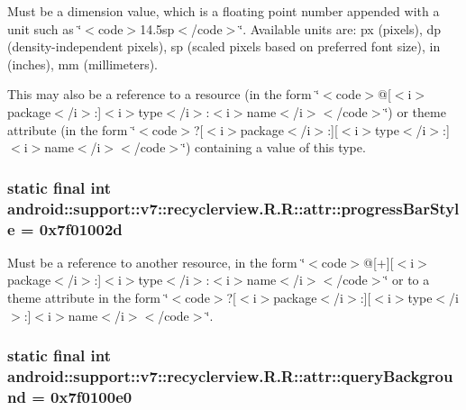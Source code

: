 Must be a dimension value, which is a floating point number appended with a unit such as \char`\"{}$<$code$>$14.5sp$<$/code$>$\char`\"{}. Available units are: px (pixels), dp (density-independent pixels), sp (scaled pixels based on preferred font size), in (inches), mm (millimeters). 

This may also be a reference to a resource (in the form \char`\"{}$<$code$>$@\mbox{[}$<$i$>$package$<$/i$>$:\mbox{]}$<$i$>$type$<$/i$>$:$<$i$>$name$<$/i$>$$<$/code$>$\char`\"{}) or theme attribute (in the form \char`\"{}$<$code$>$?\mbox{[}$<$i$>$package$<$/i$>$:\mbox{]}\mbox{[}$<$i$>$type$<$/i$>$:\mbox{]}$<$i$>$name$<$/i$>$$<$/code$>$\char`\"{}) containing a value of this type. \hypertarget{classandroid_1_1support_1_1v7_1_1recyclerview_1_1_r_1_1attr_d600f2f0a259e1c72ba1d4e9cbf3bd9f}{
\subsubsection[{progressBarStyle}]{\setlength{\rightskip}{0pt plus 5cm}static final int android::support::v7::recyclerview.R.R::attr::progressBarStyle = 0x7f01002d}}
\label{classandroid_1_1support_1_1v7_1_1recyclerview_1_1_r_1_1attr_d600f2f0a259e1c72ba1d4e9cbf3bd9f}


Must be a reference to another resource, in the form \char`\"{}$<$code$>$@\mbox{[}+\mbox{]}\mbox{[}$<$i$>$package$<$/i$>$:\mbox{]}$<$i$>$type$<$/i$>$:$<$i$>$name$<$/i$>$$<$/code$>$\char`\"{} or to a theme attribute in the form \char`\"{}$<$code$>$?\mbox{[}$<$i$>$package$<$/i$>$:\mbox{]}\mbox{[}$<$i$>$type$<$/i$>$:\mbox{]}$<$i$>$name$<$/i$>$$<$/code$>$\char`\"{}. \hypertarget{classandroid_1_1support_1_1v7_1_1recyclerview_1_1_r_1_1attr_2b81323e0855856982097b3c13b3d788}{
\subsubsection[{queryBackground}]{\setlength{\rightskip}{0pt plus 5cm}static final int android::support::v7::recyclerview.R.R::attr::queryBackground = 0x7f0100e0}}
\label{classandroid_1_1support_1_1v7_1_1recyclerview_1_1_r_1_1attr_2b81323e0855856982097b3c13b3d788}


